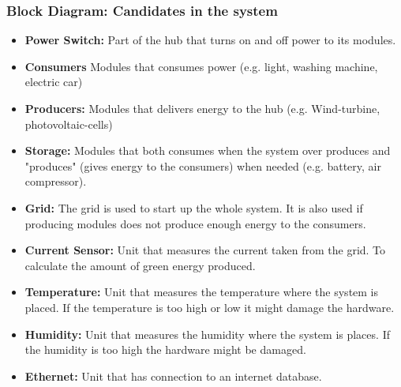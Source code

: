 			\subsubsection{Block Diagram: Candidates in the system}
			\begin{itemize}
				\item \textbf{Power Switch:} Part of the hub that turns on and off power to its modules.
				\item \textbf{Consumers} Modules that consumes power (e.g. light, washing machine, electric car)
				\item \textbf{Producers:} Modules that delivers energy to the hub (e.g. Wind-turbine, photovoltaic-cells)
				\item \textbf{Storage:} Modules that both consumes when the system over produces and "produces" (gives energy to the consumers) 
				when needed (e.g. battery, air compressor). 
				\item \textbf{Grid:} The grid is used to start up the whole system. It is also used if producing modules does not produce 
				enough energy to the consumers.
				\item \textbf{Current Sensor:} Unit that measures the current taken from the grid. To calculate the amount of green energy produced.
				\item \textbf{Temperature:} Unit that measures the temperature where the system is placed. If the temperature is too high or 
				low it might damage the hardware.
				\item \textbf{Humidity:} Unit that measures the humidity where the system is places. If the humidity is too high the 
				hardware might be damaged.
				\item \textbf{Ethernet:} Unit that has connection to an internet database.

			\end{itemize}
